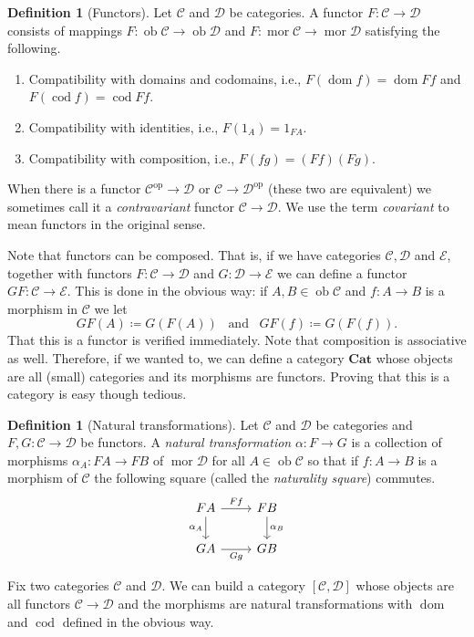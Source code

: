 \documentclass{report}
\newcommand{\mbold}[1]{\mathrm{\mathbf{#1}}}
\DeclareMathOperator{\ob}{ob}
\DeclareMathOperator{\mor}{mor}
\DeclareMathOperator{\dom}{dom}
\DeclareMathOperator{\cod}{cod}
\theoremstyle{definition}
\theoremstyle{plain}
\theoremstyle{definition}
\newtheorem{defn}[thm]{Definition}
\begin{document}
	\begin{defn}[Functors]
		Let $\mathcal{C}$ and $\mathcal{D}$ be categories. A functor $F\colon \mathcal{C} \to \mathcal{D}$ consists of mappings $F\colon \ob \mathcal{C} \to \ob \mathcal{D}$ and $F\colon \mor \mathcal{C} \to \mor \mathcal{D}$ satisfying  the following.
		\begin{enumerate}
			\item Compatibility with domains and codomains, i.e., $F(\dom f) = \dom Ff$ and $F(\cod f) = \cod Ff$.
			\item Compatibility with identities, i.e., $F(1_A) = 1_{FA}$.
			\item Compatibility with composition, i.e., $F(fg) = (Ff)(Fg)$.
		\end{enumerate}
	\end{defn}
	When there is a functor $\mathcal{C}^{\text{op}} \to \mathcal{D}$ or $\mathcal{C} \to \mathcal{D}^{\text{op}}$ (these two are equivalent) we sometimes call it a \emph{contravariant} functor $\mathcal{C} \to \mathcal{D}$. We use the term \emph{covariant} to mean functors in the original sense.
	
	Note that functors can be composed. That is, if we have categories $\mathcal{C},\mathcal{D}$ and $\mathcal{E}$, together with functors $F\colon\mathcal{C}\to\mathcal{D}$ and $G\colon \mathcal{D}\to\mathcal{E}$ we can define a functor $GF\colon \mathcal{C}\to\mathcal{E}$. This is done in the obvious way: if $A,B\in\ob \mathcal{C}$ and $f\colon A \to B$ is a morphism in $\mathcal{C}$ we let 
	\[
		GF(A) \coloneqq G(F(A)) \,\,\, \text{ and }\,\,\, GF(f) \coloneqq G(F(f)).
	\]
	That this is a functor is verified immediately. Note that composition is associative as well. Therefore, if we wanted to, we can define a category $\mbold{Cat}$ whose objects are all (small) categories and its morphisms are functors. Proving that this is a category is easy though tedious.
	\begin{defn}[Natural transformations]
		Let $\mathcal{C}$ and $\mathcal{D}$ be categories and $F,G\colon \mathcal{C} \to \mathcal{D}$ be functors. A \emph{natural transformation} $\alpha \colon F \to G$ is a collection of morphisms $\alpha_A \colon FA \to FB$ of $\mor \mathcal{D}$ for all $A\in \ob \mathcal{C}$ so that if $f \colon A \to B$ is a morphism of $\mathcal{C}$ the following square (called the \emph{naturality square}) commutes.
		\[\begin{tikzcd}
			FA & FB \\
			GA & GB
			\arrow["Ff", from=1-1, to=1-2]
			\arrow["Gg"', from=2-1, to=2-2]
			\arrow["{\alpha_A}"', from=1-1, to=2-1]
			\arrow["{\alpha_B}", from=1-2, to=2-2]
		\end{tikzcd}\]
	\end{defn}
	Fix two categories $\mathcal{C}$ and $\mathcal{D}$. We can build a category $[\mathcal{C}, \mathcal{D}]$ whose objects are all functors $\mathcal{C}\to \mathcal{D}$ and the morphisms are natural transformations with $\dom$ and $\cod$ defined in the obvious way. 
	
\end{document}
